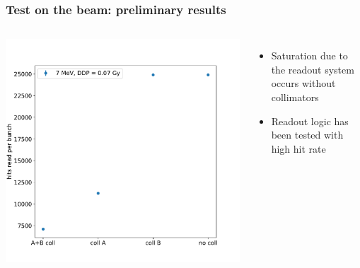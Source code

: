     \begin{frame}
        \frametitle{Test on the beam: preliminary results}
        \begin{columns}
                \includegraphics[width=1.1\linewidth]{figures/test_beam/hits.pdf}  
                \begin{itemize}
                    \item Saturation due to the readout system occurs without collimators
                    \item Readout logic has been tested with high hit rate
                \end{itemize}
            \end{columns}
        \end{frame}  